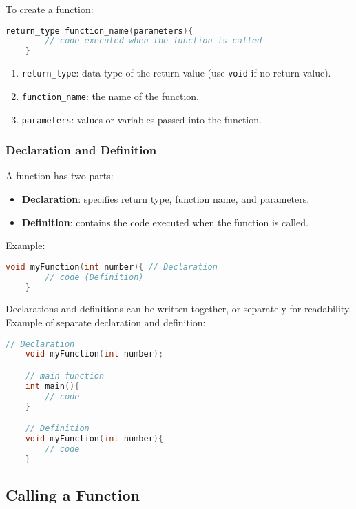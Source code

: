 To create a function:
{
\captionsetup[lstlisting]{labelformat=empty, justification=raggedright, singlelinecheck=false}
\begin{lstlisting}[language=c, caption={syntax}]
	return_type function_name(parameters){
		// code executed when the function is called
	}
\end{lstlisting}
}

\begin{enumerate}[label={}, leftmargin=*]
    \item \verb|return_type|: data type of the return value (use \verb|void| if no return value).  
    \item \verb|function_name|: the name of the function.  
    \item \verb|parameters|: values or variables passed into the function.
\end{enumerate}

\subsubsection{Declaration and Definition}

A function has two parts:
\begin{itemize}
    \item \textbf{Declaration}: specifies return type, function name, and parameters.  
    \item \textbf{Definition}: contains the code executed when the function is called.
\end{itemize}

Example:
\begin{lstlisting}[language=c]
	void myFunction(int number){ // Declaration
		// code (Definition)
	}
\end{lstlisting}

Declarations and definitions can be written together, or separately for readability.  
Example of separate declaration and definition:
\begin{lstlisting}[language=c]
	// Declaration
	void myFunction(int number);

	// main function
	int main(){
		// code
	}

	// Definition
	void myFunction(int number){
		// code
	}
\end{lstlisting}

\subsection{Calling a Function}

